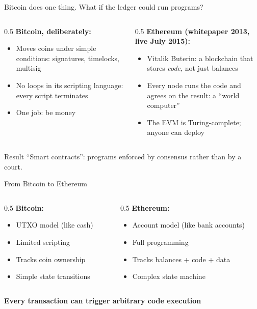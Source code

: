 \ifdefined\PRESENTATION\else\PassOptionsToClass{handout}{beamer}\fi\documentclass[aspectratio=169, lualatex]{beamer}
\begin{document}
\begin{frame}{Bitcoin does one thing. What if the ledger could run programs?}
	\begin{columns}[c]
		\begin{column}{0.5\textwidth}
			\textbf{Bitcoin, deliberately:}
			\begin{itemize}
				\item Moves coins under simple conditions: signatures, timelocks, multisig
				\item No loops in its scripting language: every script terminates
				\item One job: be money
			\end{itemize}
		\end{column}
		\begin{column}{0.5\textwidth}
			\textbf{Ethereum (whitepaper 2013, live July 2015):}
			\begin{itemize}
				\item Vitalik Buterin: a blockchain that stores \emph{code}, not just balances
				\item Every node runs the code and agrees on the result: a ``world computer''
				\item The EVM is Turing-complete; anyone can deploy
			\end{itemize}
		\end{column}
	\end{columns}
	\begin{alertblock}{Result}
		``Smart contracts'': programs enforced by consensus rather than by a court.
	\end{alertblock}
\end{frame}

\begin{frame}{From Bitcoin to Ethereum}
	\begin{columns}[c]
		\begin{column}{0.5\textwidth}
			\textbf{Bitcoin:}
			\begin{itemize}
				\item UTXO model (like cash)
				\item Limited scripting
				\item Tracks coin ownership
				\item Simple state transitions
			\end{itemize}
		\end{column}
		\begin{column}{0.5\textwidth}
			\textbf{Ethereum:}
			\begin{itemize}
				\item Account model (like bank accounts)
				\item Full programming
				\item Tracks balances + code + data
				\item Complex state machine
			\end{itemize}
		\end{column}
	\end{columns}
	\vspace{1em}
	\begin{center}
		\textbf{Every transaction can trigger arbitrary code execution}
	\end{center}
\end{frame}
\end{document}

